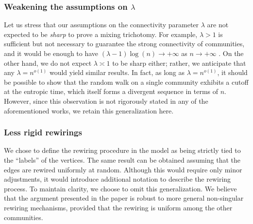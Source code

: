 \documentclass[11pt,oneside]{amsart}
\numberwithin{equation}{section}  %
\theoremstyle{plain}
\begin{document}
\subsubsection*{Weakening the assumptions on $\lambda$}
Let us stress that our assumptions on the connectivity parameter $\lambda$ are not expected to be \emph{sharp} to prove a mixing trichotomy. For example, $\lambda>1$ is sufficient but not necessary to guarantee the strong connectivity of communities, and it would be enough to have $(\lambda-1)\log(n)\to +\infty$ as $n\to+\infty$ \cite{CF}.
On the other hand, we do not expect $\lambda\asymp 1$ to be sharp either; rather, we anticipate that any $\lambda=n^{o(1)}$ would yield similar results. In fact, as long as $\lambda=n^{o(1)}$, it should be possible to show 
that the random walk on a single community exhibits a cutoff at the entropic time, which itself forms a divergent sequence in terms of $n$. 
However, since this observation is not rigorously stated in any of the
aforementioned works, we retain this generalization here.

\subsubsection*{Less rigid rewirings}
We chose to define the rewiring procedure in the model as being strictly tied to the ``labels'' of the vertices. The same result can be obtained assuming that the edges are rewired uniformly at random. Although this would require only minor adjustments, it would introduce additional notation to describe the rewiring process. To maintain clarity, we choose to omit this generalization. We believe that the argument presented in the paper is robust to more general non-singular rewiring mechanisms, provided that the rewiring is uniform among the other communities.
\end{document}
